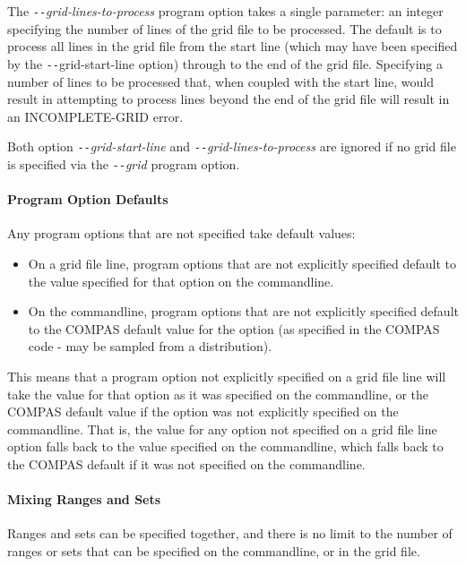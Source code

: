 The \texttt{-{}-}\textit{grid-lines-to-process} program option takes a single parameter: an integer specifying the number of lines of the grid file to be processed.  The default is to process all lines in the grid file from the start line (which may have been specified by the \texttt{-{}-}grid-start-line option) through to the end of the grid file.  Specifying a number of lines to be processed that, when coupled with the start line, would result in attempting to process lines beyond the end of the grid file will result in an INCOMPLETE-GRID error.

Both option \texttt{-{}-}\textit{grid-start-line} and \texttt{-{}-}\textit{grid-lines-to-process} are ignored if no grid file is specified via the \texttt{-{}-}\textit{grid} program option.


\paragraph{Program Option Defaults}\label{sec:ProgramOptionsdefaults}\mbox{}

Any program options that are not specified take default values:

\begin{itemize}
\item On a grid file line, program options that are not explicitly specified default to the value specified for that option on the commandline.
\item On the commandline, program options that are not explicitly specified default to the COMPAS default value for the option (as specified in the COMPAS code - may be sampled from a distribution).
\end{itemize}

This means that a program option not explicitly specified on a grid file line will take the value for that option as it was specified on the commandline, or the COMPAS default value if the option was not explicitly specified on the commandline. That is, the value for any option not specified on a grid file line option falls back to the value specified on the commandline, which falls back to the COMPAS default if it was not specified on the commandline.

\paragraph{Mixing Ranges and Sets}\label{sec:MixingRangesAndSets}\mbox{}

Ranges and sets can be specified together, and there is no limit to the number of ranges or sets that can be specified on the commandline, or in the grid file.

